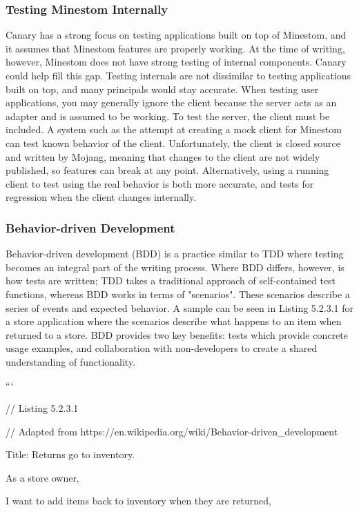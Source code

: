 \documentclass{article}
\begin{document}
\begin{onehalfspacing}
\subsubsection{Testing Minestom Internally}

Canary has a strong focus on testing applications built on top of
Minestom, and it assumes that Minestom features are properly working. At
the time of writing, however, Minestom does not have strong testing of
internal components. Canary could help fill this gap. Testing internals
are not dissimilar to testing applications built on top, and many
principals would stay accurate. When testing user applications, you may
generally ignore the client because the server acts as an adapter and is
assumed to be working. To test the server, the client must be included.
A system such as the attempt at creating a mock client for Minestom can
test known behavior of the client. Unfortunately, the client is closed
source and written by Mojang, meaning that changes to the client are not
widely published, so features can break at any point. Alternatively,
using a running client to test using the real behavior is both more
accurate, and tests for regression when the client changes internally.

\subsubsection{Behavior-driven Development}

Behavior-driven development (BDD) is a practice similar to TDD where
testing becomes an integral part of the writing process. Where BDD
differs, however, is how tests are written; TDD takes a traditional
approach of self-contained test functions, whereas BDD works in terms of
"scenarios". These scenarios describe a series of events and expected
behavior. A sample can be seen in Listing 5.2.3.1 for a store
application where the scenarios describe what happens to an item when
returned to a store. BDD provides two key benefits: tests which provide
concrete usage examples, and collaboration with non-developers to create
a shared understanding of functionality.

```

// Listing 5.2.3.1

// Adapted from
https://en.wikipedia.org/wiki/Behavior-driven\_development

Title: Returns go to inventory.

As a store owner,

I want to add items back to inventory when they are returned,


\end{onehalfspacing}
\end{document}
